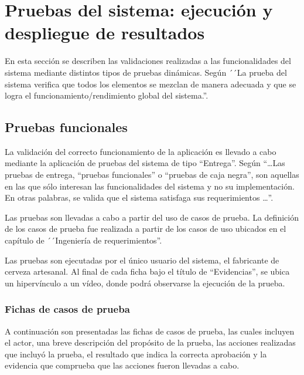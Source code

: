 \section{Pruebas del sistema: ejecución y despliegue de resultados}

\par En esta sección se describen las validaciones realizadas a las funcionalidades del sistema mediante distintos tipos de pruebas dinámicas. Según \cite{Press10} ´´La prueba del sistema verifica que todos los elementos se mezclan de manera adecuada y que se logra el funcionamiento/rendimiento global del sistema.''.

\subsection{Pruebas funcionales}

\par La validación del correcto funcionamiento de la aplicación es llevado a cabo mediante la aplicación de pruebas del sistema de tipo ``Entrega''. Según \cite{Som05} ``\ldots Las pruebas de entrega, “pruebas funcionales” o “pruebas de caja negra”, son aquellas en las que sólo interesan las funcionalidades del sistema y no su implementación. En otras palabras, se valida que el sistema satisfaga sus requerimientos \ldots''.
\par Las pruebas son llevadas a cabo a partir del uso de casos de prueba. La definición de los casos de prueba fue realizada a partir de los casos de uso ubicados en el capítulo de ´´Ingeniería de requerimientos''.
\par Las pruebas son ejecutadas por el único usuario del sistema, el fabricante de cerveza artesanal. Al final de cada ficha bajo el título de ``Evidencias'', se ubica un hipervínculo a un vídeo, donde podrá observarse la ejecución de la prueba.

\subsubsection{Fichas de casos de prueba}

\par A continuación son presentadas las fichas de casos de prueba, las cuales incluyen el actor, una breve descripción del propósito de la prueba, las acciones realizadas que incluyó la prueba, el resultado que indica la correcta aprobación y la evidencia que comprueba que las acciones fueron llevadas a cabo.


